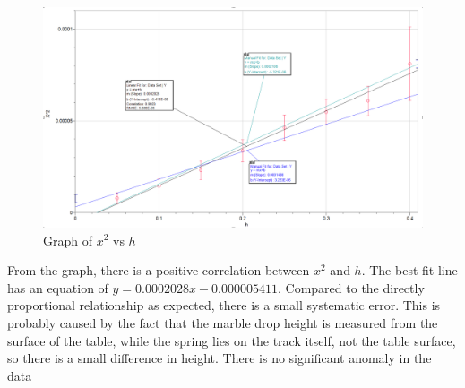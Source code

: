 \FloatBarrier
\begin{figure}
    \includegraphics[width = \textwidth]{graph.png}
    \caption{Graph of $x^2$ vs $h$}
\end{figure}
\FloatBarrier
From the graph, there is a positive correlation between $x^2$ and $h$. The best fit line has an equation of $y = 0.0002028x - 0.000005411$. Compared to the directly proportional relationship as expected, there is a small systematic error. This is probably caused by the fact that the marble drop height is measured from the surface of the table, while the spring lies on the track itself, not the table surface, so there is a small difference in height. There is no significant anomaly in the data